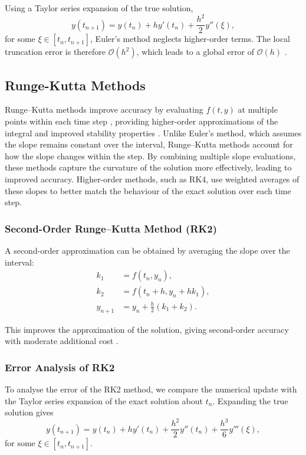\documentclass{article}
\begin{document}
Using a Taylor series expansion of the true solution,
\begin{equation}
y(t_{n+1}) = y(t_n) + h y'(t_n) + \frac{h^2}{2} y''(\xi),
\end{equation}
for some $\xi \in [t_n, t_{n+1}]$, Euler’s method neglects higher-order terms. The local truncation error is therefore $\mathcal{O}(h^2)$, which leads to a global error of $\mathcal{O}(h)$ \cite{4}.

\subsection{Runge-Kutta Methods}

Runge--Kutta methods improve accuracy by evaluating $f(t,y)$ at multiple points within each time step \cite{1}, providing higher-order approximations of the integral and improved stability properties \cite{9}.
Unlike Euler’s method, which assumes the slope remains constant over the interval, Runge--Kutta methods account for how the slope changes within the step. By combining multiple slope evaluations, these methods capture the curvature of the solution more effectively, leading to improved accuracy. Higher-order methods, such as RK4, use weighted averages of these slopes to better match the behaviour of the exact solution over each time step.

\subsubsection{Second-Order Runge--Kutta Method (RK2)}

A second-order approximation can be obtained by averaging the slope over the interval:
\begin{align}
k_1 &= f(t_n, y_n), \\
k_2 &= f(t_n + h, y_n + h k_1), \\
y_{n+1} &= y_n + \frac{h}{2}(k_1 + k_2).
\end{align}

This improves the approximation of the solution, giving second-order accuracy with moderate additional cost \cite{2}.

\subsubsection{Error Analysis of RK2}

To analyse the error of the RK2 method, we compare the numerical update with the Taylor series expansion of the exact solution about $t_n$. Expanding the true solution gives
\begin{equation}
y(t_{n+1}) = y(t_n) + h y'(t_n) + \frac{h^2}{2} y''(t_n) + \frac{h^3}{6} y'''(\xi),
\end{equation}
for some $\xi \in [t_n, t_{n+1}]$.
\end{document}
